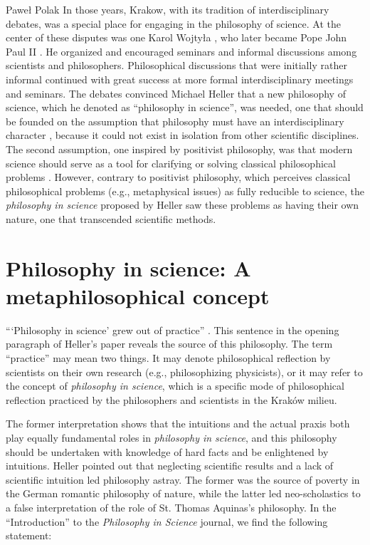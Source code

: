 \begin{artengenv}{Paweł Polak}
In those years, Krakow, with its tradition of interdisciplinary debates, was a special place for engaging in the
philosophy of science. At the center of these disputes was one Karol Wojtyła
\parencite[p.8nn]{pol_zycinski_kartki_1999},
who later became
Pope John Paul II . He organized and encouraged seminars and informal discussions among scientists and philosophers.
Philosophical discussions that were initially rather informal continued with great success at more formal
interdisciplinary meetings and seminars. The debates convinced Michael Heller that a new philosophy of science, which
he denoted as ``philosophy in science'', was needed, one that should be founded on the assumption that philosophy must
have an interdisciplinary character
\parencite[p.50]{pol_heller_poczatki_2006},
because it could not exist in isolation from other
scientific disciplines. The second assumption, one inspired by positivist philosophy, was that modern science should
serve as a tool for clarifying or solving classical philosophical problems
\parencite[p.50]{pol_heller_poczatki_2006}.
However,
contrary to positivist philosophy, which perceives classical philosophical problems (e.g., metaphysical issues) as
fully reducible to science, the \textit{philosophy in science }proposed by Heller saw these problems as having their
own nature, one that transcended scientific methods.

\section{Philosophy in science: A metaphilosophical concept}
``‘Philosophy in science’ grew out of practice''
\parencite[p.\pageref{heller-out-of}]{pol_heller_how_2019}.
This sentence in the opening paragraph of
Heller’s paper reveals the source of this philosophy. The term ``practice'' may mean two things. It may denote
philosophical reflection by scientists on their own research (e.g., philosophizing physicists), or it may refer to the
concept of \textit{philosophy in science}, which is a specific mode of philosophical reflection practiced by the
philosophers and scientists in the Kraków milieu. 

The former interpretation shows that the intuitions and the actual praxis both play equally fundamental roles in
\textit{philosophy in science}, and this philosophy should be undertaken with knowledge of hard facts and be
enlightened by intuitions. Heller
\parencite*[p.86]{pol_heller_philosophy_2011}
pointed out that neglecting scientific results and a lack of scientific
intuition led philosophy astray. The former was the source of poverty in the German romantic philosophy of nature,
while the latter led neo-scholastics to a false interpretation of the role of St. Thomas Aquinas’s philosophy. In the
``Introduction'' to the \textit{Philosophy in Science }journal, we find the following statement:


\end{artengenv}
